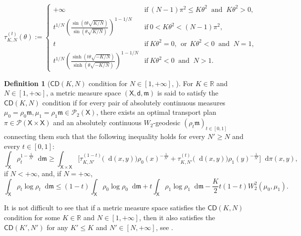 \documentclass[11pt,twoside,a4paper]{article}
\newcommand*\diff{\mathop{}\!\mathrm{d}}
\newcommand{\R}{\mathbb{R}}
\newcommand{\prob}{\mathscr P}
\newcommand{\cd}{\mathsf{CD}}
\newcommand{\X}{\mathsf{X}}
\newcommand{\di}
{\mathsf d} %
\newcommand{\m}{\mathfrak m} %
\newcommand{\Prob}{\mathscr{P}}
\theoremstyle{theorem}
\theoremstyle{definition}
\newtheorem{definition}[theorem]{Definition}
\theoremstyle{remark}
\theoremstyle{proof}
\begin{document}
\begin{equation*}
\tau_{K,N}^{(t)}(\theta):=
%
\begin{cases}

%
\displaystyle  +\infty & \textrm{if}\  (N-1)\pi^{2}\leq K\theta^{2} ~\text{ and }~K\theta^2>0,\\
%
\displaystyle t^{1/N}\left(\frac{\sin(t\theta\sqrt{K/N})}{\sin(\theta\sqrt{K/N})}\right)^{1-1/N} & \textrm{if}\  0 < K\theta^{2} < (N-1)\pi^{2},\\
%
t & \textrm{if}\ %
K\theta^2 =0, ~~\text{or}~~K\theta^2<0~\text{ and }~N=1, \\
%
\displaystyle  t^{1/N}\left(\frac{\sinh(t\theta\sqrt{-K/N})}{\sinh(\theta\sqrt{-K/N})}\right)^{1-1/N} & \textrm{if}\ K\theta^2 < 0~\text{ and }~N>1.
%
\end{cases}
\end{equation*}

\begin{definition}[{$\cd(K,N)$ condition for $N\in[1,+\infty]$, \cite{sturm2006, lott--villani2009}}]\label{def.2.1}
For $K\in\R$ and $N\in[1,+\infty]$, a metric measure space $(\X,\di,\m)$ is said to satisfy the $\cd(K,N)$ condition if for every pair of absolutely continuous measures $\mu_0=\rho_0\m,\mu_1= \rho_1 \m \in \Prob_2(\X)$, there exists an optimal transport plan $\pi\in \prob(\X\times \X)$ and an absolutely continuous $W_2$-geodesic $(\rho_t\m)_{t\in [0,1]}$ connecting them such that the following inequality holds for every $N' \geq N$ and every $t \in [0,1]$:
\begin{equation*}\label{eq:CDpositive}
    \int_\X \rho_t^{1-\frac 1{N'}} \diff \m \geq \int_{\X \times \X} \Big[ \tau^{(1-t)}_{K,N'} \big(\diff(x,y) \big) \rho_{0}(x)^{-\frac{1}{N'}} +    \tau^{(t)}_{K,N'} \big(\diff(x,y) \big) \rho_{1}(y)^{-\frac{1}{N'}} \Big]    \diff \pi( x,y),
\end{equation*}
if $N < +\infty$, and, if $N = +\infty$,
 \[
    \int_\X\rho_t\log\rho_t \diff\m \leq (1 - t)\int_\X\rho_0\log\rho_0 \diff\m + t \int_\X\rho_1\log\rho_1 \diff\m - \frac{K}{2} t(1 - t) W_2^2(\mu_0, \mu_1).\]
\end{definition}
\noindent It is not difficult to see that if a metric measure space satisfies the $\mathsf{CD}(K, N)$ condition for some $K \in \R$ and $N \in [1, +\infty]$, then it also satisfies the $\mathsf{CD}(K', N')$ for any $K' \leq K$ and $N' \in [N,+\infty]$, see \cite[Prop. 1.6]{sturm2006}.
\end{document}
